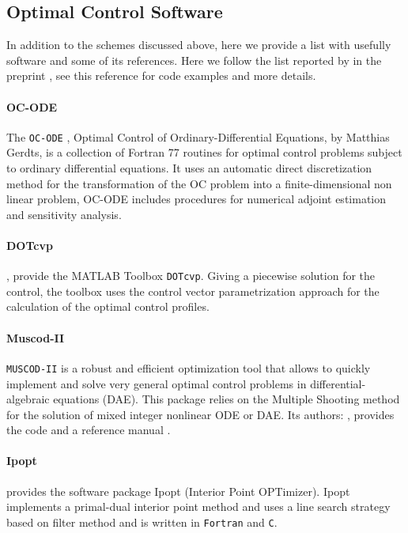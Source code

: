 \subsection{Optimal Control Software}
  In addition to the schemes discussed above, here we provide a list with 
usefully software and some of its references. Here we follow the list reported
by \citeauthor*{Rodrigues2014a} in the preprint \cite{Rodrigues2014a}, see this 
reference for code examples and more details.
\medskip
\paragraph{OC-ODE}
  The \verb|OC-ODE| \cite{Gerdts2009}, Optimal Control of Ordinary-Differential 
Equations, by Matthias Gerdts, is a collection of Fortran 77 routines for 
optimal control problems subject to ordinary differential equations. It uses an 
automatic direct discretization method for the transformation of the OC problem 
into a finite-dimensional non linear problem, OC-ODE includes procedures for 
numerical adjoint estimation and sensitivity analysis. 
\medskip
\paragraph{DOTcvp}
  \citet{Hirmajer2009}, provide the MATLAB Toolbox \verb|DOTcvp|. Giving a 
piecewise solution for the control, the toolbox uses the control vector 
parametrization approach for the calculation of the  optimal control profiles. 
\medskip
\paragraph{Muscod-II}
  
  \verb|MUSCOD-II| is a robust and efficient optimization tool that allows to
quickly implement and solve very general optimal control problems in 
differential-algebraic equations (DAE). This package relies on the Multiple 
Shooting method for the solution of mixed integer nonlinear ODE or DAE. Its 
authors: \citeauthor*{Diehl2001}, provides the code and a reference manual 
\cite{Diehl2001}.
\medskip
\paragraph{Ipopt}
  \citet*{Wachter2006} provides the software package Ipopt (Interior Point 
  OPTimizer). Ipopt implements a primal-dual interior point method and uses a 
  line search strategy based on filter method and is written in \verb|Fortran| 
  and \verb|C|.
\medskip  
